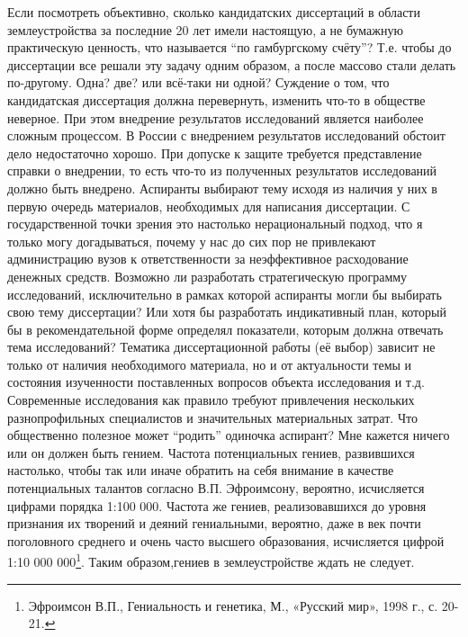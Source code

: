 \begin{drama}
	\maxspeaks  Если посмотреть объективно, сколько кандидатских диссертаций в области землеустройства за последние 20 лет имели настоящую, а не бумажную практическую ценность, что называется “по гамбургскому счёту”? Т.е. чтобы до диссертации все решали эту задачу одним образом, а после массово стали делать по-другому. Одна? две? или всё-таки ни одной? 
	\michaelspeaks Суждение о том, что кандидатская диссертация должна перевернуть, изменить что-то в обществе неверное. При этом внедрение результатов исследований является наиболее сложным процессом. В России с внедрением результатов исследований обстоит дело недостаточно хорошо. При допуске к защите требуется представление справки о внедрении, то есть что-то из полученных результатов исследований должно быть внедрено.
	\maxspeaks Аспиранты выбирают тему исходя из наличия у них в первую очередь материалов, необходимых для написания диссертации. С государственной точки зрения это настолько нерациональный подход, что я только могу догадываться, почему у нас до сих пор не привлекают администрацию вузов к ответственности за неэффективное расходование денежных средств. Возможно ли разработать стратегическую программу исследований, исключительно в рамках которой аспиранты могли бы выбирать свою тему диссертации? Или хотя бы разработать индикативный план, который бы в рекомендательной форме определял показатели, которым должна отвечать тема исследований?
	\michaelspeaks Тематика диссертационной работы (её выбор) зависит не только от наличия необходимого материала, но и от актуальности темы и состояния изученности поставленных вопросов объекта исследования и т.д.
	\maxspeaks Современные исследования как правило требуют привлечения нескольких разнопрофильных специалистов и значительных материальных затрат. Что общественно полезное может “родить” одиночка аспирант? Мне кажется ничего или он должен быть гением. Частота потенциальных гениев, развившихся настолько, чтобы так или иначе обратить на себя внимание в качестве потенциальных талантов согласно В.П. Эфроимсону, вероятно, исчисляется цифрами порядка 1:100 000. Частота же гениев, реализовавшихся до уровня признания их творений и деяний гениальными, вероятно, даже в век почти поголовного среднего и очень часто высшего образования, исчисляется цифрой 1:10 000 000\footnote{Эфроимсон В.П., Гениальность и генетика, М., «Русский мир», 1998 г., с. 20-21.}. Таким образом,гениев в землеустройстве ждать не следует. 

\end{drama}
